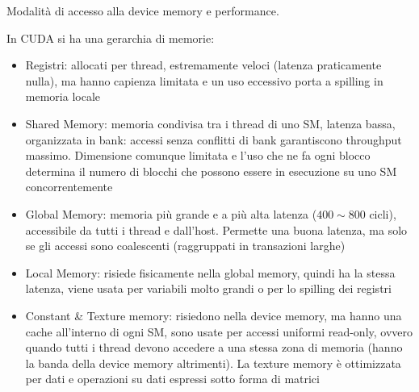 \begin{questions}
    \question Modalità di accesso alla device memory e performance.
    
    \begin{solution}
        In CUDA si ha una gerarchia di memorie: 
        \begin{itemize}
            \item Registri: allocati per thread, estremamente veloci (latenza praticamente nulla), ma hanno capienza limitata e un uso eccessivo porta a spilling in memoria locale
            
            \item Shared Memory: memoria condivisa tra i thread di uno SM, latenza bassa, organizzata in bank: accessi senza conflitti di bank garantiscono throughput massimo. Dimensione comunque limitata e l'uso che ne fa ogni blocco determina il numero di blocchi che possono essere in esecuzione su uno SM concorrentemente
            
            \item Global Memory: memoria più grande e a più alta latenza ($400 \sim 800$ cicli), accessibile da tutti i thread e dall'host. Permette una buona latenza, ma solo se gli accessi sono coalescenti (raggruppati in transazioni larghe)
            
            \item Local Memory: risiede fisicamente nella global memory, quindi ha la stessa latenza, viene usata per variabili molto grandi o per lo spilling dei registri
            
            \item Constant \& Texture memory: risiedono nella device memory, ma hanno una cache all'interno di ogni SM, sono usate per accessi uniformi read-only, ovvero quando tutti i thread devono accedere a una stessa zona di memoria (hanno la banda della device memory altrimenti). La texture memory è ottimizzata per dati e operazioni su dati espressi sotto forma di matrici
        \end{itemize}
    \end{solution}
\end{questions}